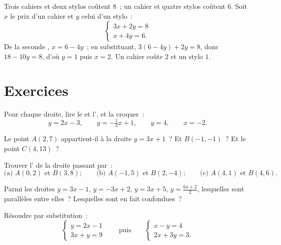 \begin{example}\label{ex:g10:lines:modeling}
Trois cahiers et deux stylos coûtent $8$~; un cahier et quatre stylos
coûtent $6$. Soit $x$ le prix d'un cahier et $y$ celui d'un stylo~:
\[
\begin{cases}
3x + 2y = 8 \\
x + 4y = 6 .
\end{cases}
\]
De la seconde , $x = 6 - 4y$~; en substituant,
$3(6 - 4y) + 2y = 8$, donc $18 - 10y = 8$, d'où $y = 1$ puis $x = 2$. Un
cahier coûte $2$ et un stylo $1$.
\end{example}

\section{Exercices}

\begin{exercise}[$\star$]\label{exo:g10:lines:1}
Pour chaque droite, lire le  et l', et la croquer~:
\[
y = 2x - 3, \qquad
y = -\tfrac13 x + 1, \qquad
y = 4, \qquad
x = -2 .
\]
\end{exercise}

\begin{exercise}[$\star$]\label{exo:g10:lines:2}
Le point $A(2, 7)$ appartient-il à la droite $y = 3x + 1$~? Et
$B(-1, -1)$~? Et le point $C(4, 13)$~?
\end{exercise}

\begin{exercise}[$\star$]\label{exo:g10:lines:3}
Trouver l' de la droite passant par~:
\[
\text{(a) } A(0, 2) \text{ et } B(3, 8);
\qquad
\text{(b) } A(-1, 5) \text{ et } B(2, -4);
\qquad
\text{(c) } A(4, 1) \text{ et } B(4, 6).
\]
\end{exercise}

\begin{exercise}[$\star$]\label{exo:g10:lines:4}
Parmi les droites $y = 3x - 1$, $y = -3x + 2$, $y = 3x + 5$,
$y = \frac{6x + 2}{2}$, lesquelles sont parallèles entre elles~?
Lesquelles sont en fait confondues~?
\end{exercise}

\begin{exercise}[$\star$]\label{exo:g10:lines:5}
Résoudre par substitution~:
\[
\begin{cases}
y = 2x - 1 \\
3x + y = 9
\end{cases}
\qquad\text{puis}\qquad
\begin{cases}
x - y = 4 \\
2x + 3y = 3 .
\end{cases}
\]
\end{exercise}

